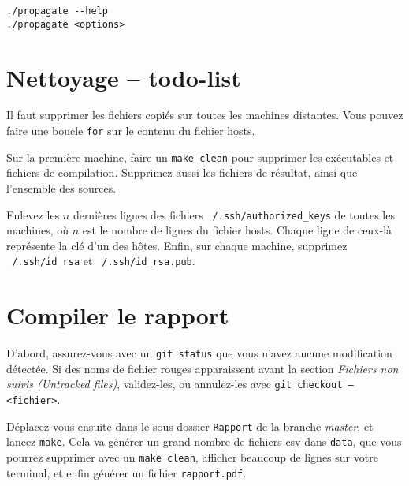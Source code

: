 \begin{verbatim}
./propagate --help
./propagate <options>
\end{verbatim}



\section{Nettoyage – todo-list}

Il faut supprimer les fichiers copiés sur toutes les machines
distantes. Vous pouvez faire une boucle \texttt{for} sur le contenu du
fichier hosts.

Sur la première machine, faire un \texttt{make clean} pour supprimer
les exécutables et fichiers de compilation. Supprimez aussi les
fichiers de résultat, ainsi que l'ensemble des sources.

Enlevez les $n$ dernières lignes des fichiers
\texttt{\string~/.ssh/authorized\_keys} de toutes les machines, où $n$
est le nombre de lignes du fichier hosts. Chaque ligne de ceux-là
représente la clé d'un des hôtes. Enfin, sur chaque machine, supprimez
\texttt{\string~/.ssh/id\_rsa} et \texttt{\string~/.ssh/id\_rsa.pub}.




\section{Compiler le rapport}

D'abord, assurez-vous avec un \texttt{git status} que vous n'avez
aucune modification détectée. Si des noms de fichier rouges
apparaissent avant la section \emph{Fichiers non suivis (Untracked
  files)}, validez-les, ou annulez-les avec \texttt{git checkout --
  <fichier>}.

Déplacez-vous ensuite dans le sous-dossier \texttt{Rapport} de la
branche \emph{master}, et lancez \texttt{make}. Cela va générer un
grand nombre de fichiers csv dans \texttt{data}, que vous pourrez
supprimer avec un \texttt{make clean}, afficher beaucoup de lignes sur
votre terminal, et enfin générer un fichier \texttt{rapport.pdf}.

